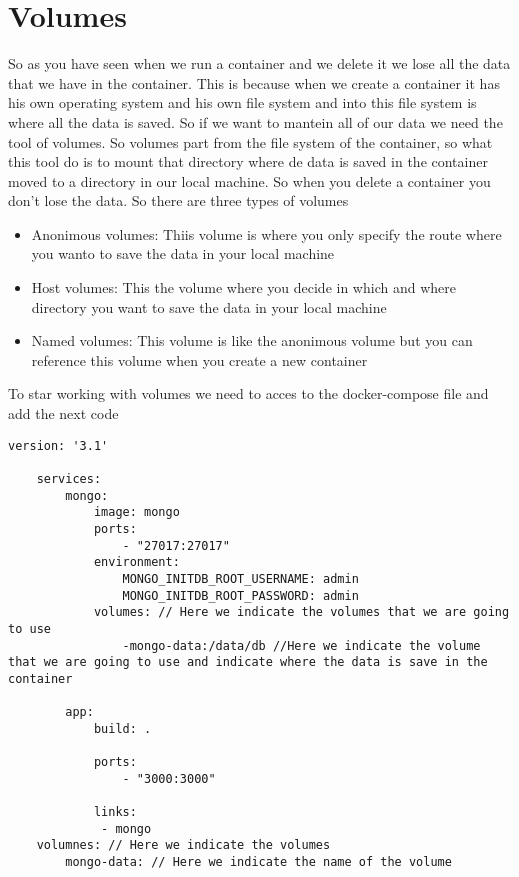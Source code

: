 \documentclass{article}
\begin{document}
\section*{Volumes}
So as you have seen when we run a container and we delete it we lose all the data that we have in the container. This is because
when we create a container it has his own operating system and his own file system and into this file system is where all the data 
is saved. So if we want to mantein all of our data we need the tool of volumes. So volumes part from the file system of the container, 
so what this tool do is to mount that directory where de data is saved in the container moved to a directory in our local machine.
So when you delete a container you don't lose the data. So there are three types of volumes 
\begin{itemize}
    \item Anonimous volumes: Thiis volume is where you only specify the route where you wanto to save the data in your local machine 
    \item Host volumes: This the volume where you decide in which and where directory you want to save the data in your local machine
    \item Named volumes: This volume is like the anonimous volume but you can reference this volume when you create a new container 
\end{itemize}

To star working with volumes we need to acces to the docker-compose file and add the next code
\begin{lstlisting}[breaklines=true, breakatwhitespace=true]
    version: '3.1' 

    services: 
        mongo: 
            image: mongo 
            ports:
                - "27017:27017"
            environment: 
                MONGO_INITDB_ROOT_USERNAME: admin
                MONGO_INITDB_ROOT_PASSWORD: admin
            volumes: // Here we indicate the volumes that we are going to use
                -mongo-data:/data/db //Here we indicate the volume that we are going to use and indicate where the data is save in the container
         
        app:
            build: . 

            ports:
                - "3000:3000"
            
            links: 
             - mongo
    volumnes: // Here we indicate the volumes 
        mongo-data: // Here we indicate the name of the volume
\end{lstlisting}
\end{document}
